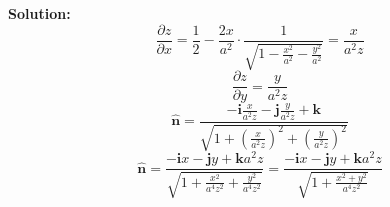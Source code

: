 \documentclass[11pt]{article}
\begin{document}
\begin{enumerate}[label= \textbf{\Alph*.}]
  \textbf{Solution:}
  \[
    \frac{\partial z}{\partial x} = \frac{1}{2} - \frac{2x}{a^2} \cdot \frac{1}{\sqrt{1-\frac{x^2}{a^2} - \frac{y^2}{a^2}} } = \frac{x}{a^2z}
  \] 
  \[
    \frac{\partial z}{\partial y} = \frac{y}{a^2z}
  \] 
  \[
    \mathbf{\hat{n}} = \frac{-\mathbf{i}\frac{x}{a^2z} - \mathbf{j}\frac{y}{a^2z} + \mathbf{k}}{\sqrt{1+(\frac{x}{a^2z})^2 + (\frac{y}{a^2z})^2} }
  \] 
  \[
    \mathbf{\hat{n}} = \frac{-\mathbf{i}x-\mathbf{j}y+\mathbf{k}a^2z}{\sqrt{1+\frac{x^2}{a^4 z^2} + \frac{y^2}{a^4z^2}}} = \frac{-\mathbf{i}x-\mathbf{j}y + \mathbf{k}a^2z}{\sqrt{1 + \frac{x^2+y^2}{a^4z^2}}}
  \] 
  \[

  \] 
\end{enumerate}
\end{document}
